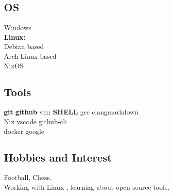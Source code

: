 \documentclass[]{deedy-resume-openfont}
\begin{document}
\begin{minipage}[t]{0.32\textwidth}
\subsection{OS}
Windows \\
\textbf{Linux:} \\
\textbullet{} Debian based \\
\textbullet{} Arch Linux based \\
\textbullet{} NixOS
\sectionsep

\subsection{Tools}
\textbullet{}\textbf{git} \textbullet{} \textbf{github} \textbullet{} vim \textbullet{} \textbf{SHELL} \textbullet{} gcc \textbullet{}clang\textbullet{}markdown\\
\textbullet{} Nix \textbullet{} vscode \textbullet{} github-cli \\
\textbullet{} docker \textbullet{}google
\sectionsep

\subsection{Hobbies and Interest}
\textbullet{}Football, Chess.\\
\textbullet{}Working with Linux , learning about open-source tools.
\sectionsep

%
%

\end{minipage} 
\hfill
\end{document}
